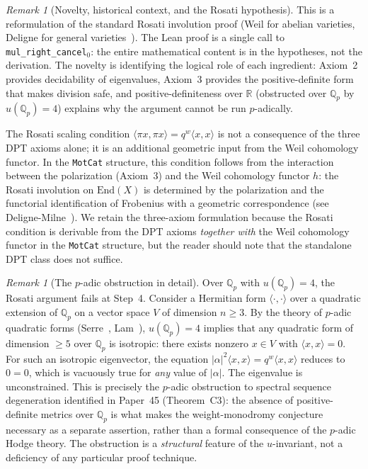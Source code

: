 \documentclass[11pt]{article}
\theoremstyle{definition}
\theoremstyle{remark}
\newtheorem{remark}[theorem]{Remark}
\newcommand{\Q}{\mathbb{Q}}
\newcommand{\R}{\mathbb{R}}
\newcommand{\Qp}{\Q_p}
\newcommand{\ip}[2]{\langle #1, #2 \rangle}
\begin{document}
\begin{remark}[Novelty, historical context, and the Rosati hypothesis]
This is a reformulation of the standard Rosati involution proof (Weil for abelian varieties, Deligne for general varieties~\cite{Deligne1974}). The Lean proof is a single call to \texttt{mul\_right\_cancel$_0$}: the entire mathematical content is in the hypotheses, not the derivation. The novelty is identifying the logical role of each ingredient: Axiom~2 provides decidability of eigenvalues, Axiom~3 provides the positive-definite form that makes division safe, and positive-definiteness over $\R$ (obstructed over $\Qp$ by $u(\Qp) = 4$) explains why the argument cannot be run $p$-adically.

The Rosati scaling condition $\ip{\pi x}{\pi x} = q^w \ip{x}{x}$ is not a consequence of the three DPT axioms alone; it is an additional geometric input from the Weil cohomology functor. In the \texttt{MotCat} structure, this condition follows from the interaction between the polarization (Axiom~3) and the Weil cohomology functor $h$: the Rosati involution on $\mathrm{End}(X)$ is determined by the polarization and the functorial identification of Frobenius with a geometric correspondence (see Deligne-Milne~\cite{DeligneMilne1982}). We retain the three-axiom formulation because the Rosati condition is derivable from the DPT axioms \emph{together with} the Weil cohomology functor in the \texttt{MotCat} structure, but the reader should note that the standalone DPT class does not suffice.
\end{remark}

\begin{remark}[The $p$-adic obstruction in detail]
Over $\Qp$ with $u(\Qp) = 4$, the Rosati argument fails at Step~4. Consider a Hermitian form $\ip{\cdot}{\cdot}$ over a quadratic extension of $\Qp$ on a vector space $V$ of dimension $n \geq 3$. By the theory of $p$-adic quadratic forms (Serre~\cite{Serre1973}, Lam~\cite{Lam2005}), $u(\Qp) = 4$ implies that any quadratic form of dimension $\geq 5$ over $\Qp$ is isotropic: there exists nonzero $x \in V$ with $\ip{x}{x} = 0$. For such an isotropic eigenvector, the equation $|\alpha|^2 \ip{x}{x} = q^w \ip{x}{x}$ reduces to $0 = 0$, which is vacuously true for \emph{any} value of $|\alpha|$. The eigenvalue is unconstrained. This is precisely the $p$-adic obstruction to spectral sequence degeneration identified in Paper~45 (Theorem~C3): the absence of positive-definite metrics over $\Qp$ is what makes the weight-monodromy conjecture necessary as a separate assertion, rather than a formal consequence of the $p$-adic Hodge theory. The obstruction is a \emph{structural} feature of the $u$-invariant, not a deficiency of any particular proof technique.
\end{remark}
\end{document}
